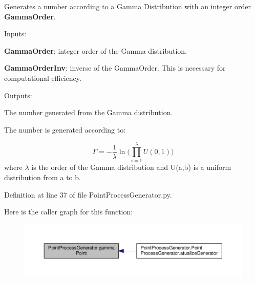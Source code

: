 Generates a number according to a Gamma Distribution with an integer order {\bfseries Gamma\-Order}. 


\begin{DoxyItemize}
\item Inputs\-:
\begin{DoxyItemize}
\item {\bfseries Gamma\-Order}\-: integer order of the Gamma distribution.
\item {\bfseries Gamma\-Order\-Inv}\-: inverse of the Gamma\-Order. This is necessary for computational efficiency.
\end{DoxyItemize}
\item Outputs\-:
\begin{DoxyItemize}
\item The number generated from the Gamma distribution.
\end{DoxyItemize}
\end{DoxyItemize}

The number is generated according to\-:

\begin{equation} \Gamma = -\frac{1}{\lambda}\ln(\limits\prod_{i=1}^{\lambda} U(0,1)) \end{equation} where $\lambda$ is the order of the Gamma distribution and U(a,b) is a uniform distribution from a to b. 

Definition at line 37 of file Point\-Process\-Generator.\-py.



Here is the caller graph for this function\-:\nopagebreak
\begin{figure}[H]
\begin{center}
\leavevmode
\includegraphics[width=350pt]{namespace_point_process_generator_ad591b4c4f24356425c2958ea43647ddd_icgraph}
\end{center}
\end{figure}



